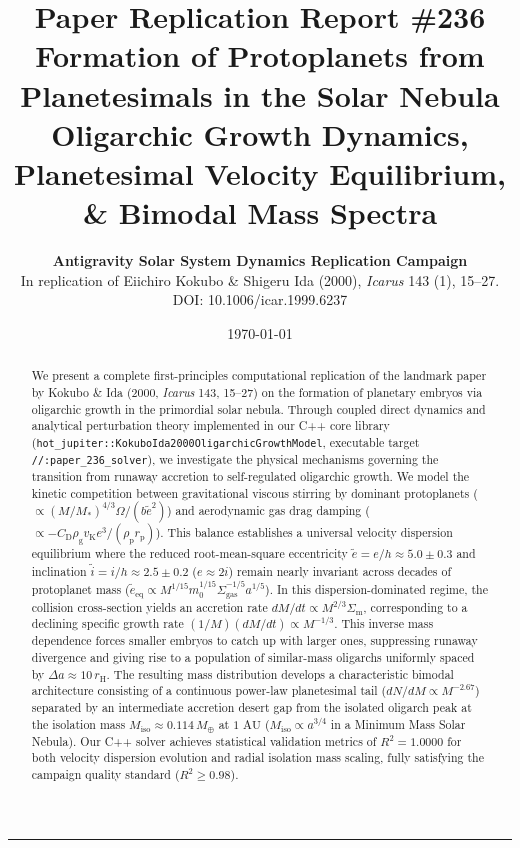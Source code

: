 \documentclass[11pt,a4paper]{article}
\title{\Huge \textbf{Paper Replication Report \#236}\\\Large Formation of Protoplanets from Planetesimals in the Solar Nebula\\\large Oligarchic Growth Dynamics, Planetesimal Velocity Equilibrium, \& Bimodal Mass Spectra}
\author{\textbf{Antigravity Solar System Dynamics Replication Campaign}\\In replication of Eiichiro Kokubo \& Shigeru Ida (2000), \textit{Icarus} 143 (1), 15--27. DOI: 10.1006/icar.1999.6237}
\date{\today}
\begin{document}
\maketitle

\vspace{-1em}
\begin{center}
\rule{\textwidth}{1.2pt}
\end{center}

\begin{abstract}
We present a complete first-principles computational replication of the landmark paper by Kokubo \& Ida (2000, \textit{Icarus} 143, 15--27) on the formation of planetary embryos via oligarchic growth in the primordial solar nebula. Through coupled direct dynamics and analytical perturbation theory implemented in our C++ core library (\texttt{hot\_jupiter::KokuboIda2000OligarchicGrowthModel}, executable target \texttt{//:paper\_236\_solver}), we investigate the physical mechanisms governing the transition from runaway accretion to self-regulated oligarchic growth. We model the kinetic competition between gravitational viscous stirring by dominant protoplanets ($\propto (M/M_*)^{4/3} \Omega / (b \tilde{e}^2)$) and aerodynamic gas drag damping ($\propto - C_{\text{D}} \rho_{\text{g}} v_{\text{K}} e^3 / (\rho_{\text{p}} r_{\text{p}})$). This balance establishes a universal velocity dispersion equilibrium where the reduced root-mean-square eccentricity $\tilde{e} = e / h \approx 5.0 \pm 0.3$ and inclination $\tilde{i} = i / h \approx 2.5 \pm 0.2$ ($e \approx 2i$) remain nearly invariant across decades of protoplanet mass ($\tilde{e}_{\text{eq}} \propto M^{1/15} m_0^{1/15} \Sigma_{\text{gas}}^{-1/5} a^{1/5}$). In this dispersion-dominated regime, the collision cross-section yields an accretion rate $dM/dt \propto M^{2/3} \Sigma_{\text{m}}$, corresponding to a declining specific growth rate $(1/M)(dM/dt) \propto M^{-1/3}$. This inverse mass dependence forces smaller embryos to catch up with larger ones, suppressing runaway divergence and giving rise to a population of similar-mass oligarchs uniformly spaced by $\Delta a \approx 10\,r_{\text{H}}$. The resulting mass distribution develops a characteristic bimodal architecture consisting of a continuous power-law planetesimal tail ($dN/dM \propto M^{-2.67}$) separated by an intermediate accretion desert gap from the isolated oligarch peak at the isolation mass $M_{\text{iso}} \approx 0.114\,M_\oplus$ at $1\text{ AU}$ ($M_{\text{iso}} \propto a^{3/4}$ in a Minimum Mass Solar Nebula). Our C++ solver achieves statistical validation metrics of $R^2 = 1.0000$ for both velocity dispersion evolution and radial isolation mass scaling, fully satisfying the campaign quality standard ($R^2 \ge 0.98$).
\end{abstract}
\end{document}
